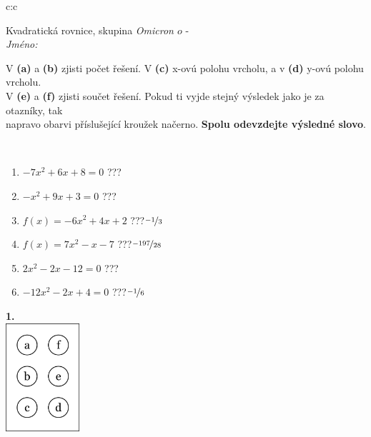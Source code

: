\documentclass[10pt]{report}
\newcommand\omicron{o}
\begin{document}
\begin{tabular}{c:c}
\begin{minipage}[c][104.5mm][t]{0.5\linewidth}
\begin{center}
\vspace{7mm}
{\huge Kvadratická rovnice, skupina \textit{Omicron $\omicron$} -}\\[5mm]
\textit{Jméno:}\phantom{xxxxxxxxxxxxxxxxxxxxxxxxxxxxxxxxxxxxxxxxxxxxxxxxxxxxxxxxxxxxxxxxx}\\[5mm]
\begin{minipage}{0.95\linewidth}
\begin{center}
V \textbf{(a)} a \textbf{(b)} zjisti počet řešení. V \textbf{(c)} x-ovú polohu vrcholu, a v \textbf{(d)} y-ovú polohu vrcholu.\\V \textbf{(e)} a \textbf{(f)} zjisti součet řešení. Pokud ti vyjde stejný výsledek jako je za otazníky, tak\\napravo obarvi příslušející kroužek načerno. \textbf{Spolu odevzdejte výsledné slovo}.
\end{center}
\end{minipage}
\\[1mm]
\begin{minipage}{0.79\linewidth}
\begin{center}
\begin{varwidth}{\linewidth}
\begin{enumerate}
\Large
\item $-7x^2+6x+8=0$\quad \dotfill\; ???\;\dotfill {}
\item $-x^2+9x+3=0$\quad \dotfill\; ???\;\dotfill {}
\item $f(x)=-6x^2+4x+2$\quad \dotfill\; ???\;\dotfill \quad $\nicefrac{-1}{3}$
\item $f(x)=7x^2-x-7$\quad \dotfill\; ???\;\dotfill \quad $\nicefrac{-197}{28}$
\item $2x^2-2x-12=0$\quad \dotfill\; ???\;\dotfill {}
\item $-12x^2-2x+4=0$\quad \dotfill\; ???\;\dotfill \quad $\nicefrac{-1}{6}$
\end{enumerate}
\end{varwidth}
\end{center}
\end{minipage}
\begin{minipage}{0.20\linewidth}
\begin{center}
{\Huge\bfseries 1.} \\[2mm]
\includegraphics[height=40mm]{../images/braille.png}

\end{center}
\end{minipage}
\end{center}
\end{minipage}
\end{tabular}
\end{document}
